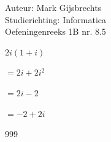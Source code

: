 \documentclass[a4paper]{article}
\begin{document}
\noindent \large Auteur: Mark Gijsbrechts \\
\noindent \large Studierichting: Informatica\\
\noindent \large Oefeningenreeks 1B nr. 8.5\\

\medskip

\normalsize

$2i(1 + i)$

$= 2i + 2i^2 $

$= 2i - 2$

$= -2 + 2i$

\begin{thebibliography}{999}
\end{thebibliography}
\end{document}
